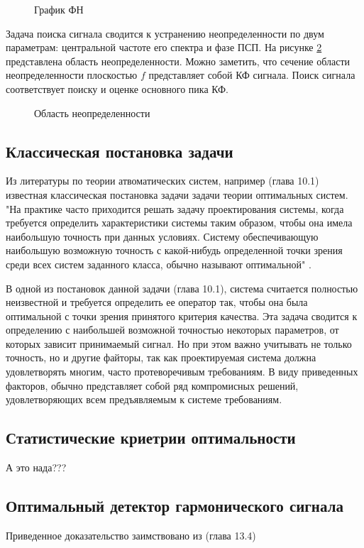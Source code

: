 \begin{figure}[H]
\center{}
\caption{График ФН}
\label{pic:corr_peak}
\end{figure}

Задача поиска сигнала сводится к устранению неопределенности по двум параметрам: центральной частоте его спектра
и фазе ПСП. На рисунке \ref{pic:ambiguity_region} представлена область неопределенности. Можно заметить, что сечение
области неопределенности плоскостью ${f}$ представляет собой КФ сигнала. Поиск сигнала соответствует поиску и
оценке основного пика КФ.

\begin{figure}[H]
\center{}
\caption{Область неопределенности}
\label{pic:ambiguity_region}
\end{figure}

\subsection{Классическая постановка задачи}
\label{sec1_FIXME}

Из литературы по теории атвоматических систем, например \cite{pugachev} (глава 10.1) известная классическая постановка
задачи задачи теории оптимальных систем. "На практике часто приходится решать задачу проектирования системы, когда
требуется определить характеристики системы таким образом, чтобы она имела наибольшую точность при данных условиях.
Систему обеспечивающую наибольшую возможную точность с какой-нибудь определенной точки зрения среди всех систем
заданного класса, обычно называют оптимальной" \cite{pugachev}.

В одной из постановок данной задачи \cite{pugachev} (глава 10.1), система считается полностью неизвестной
и требуется определить ее оператор так, чтобы она была оптимальной с точки зрения принятого критерия качества. Эта
задача сводится к определению с наибольшей возможной точностью некоторых параметров, от которых зависит принимаемый
сигнал. Но при этом важно учитывать не только точность, но и другие файторы, так как проектируемая система должна
удовлетворять многим, часто протеворечивым требованиям. В виду приведенных факторов, обычно представляет собой
ряд компромисных решений, удовлетворяющих всем предъявляемым к системе требованиям.

\subsection{Статистические криетрии оптимальности}
А это нада???

\subsection{Оптимальный детектор гармонического сигнала}

Приведенное доказательство заимствовано из \cite{pugachev} (глава 13.4)

\newpage
